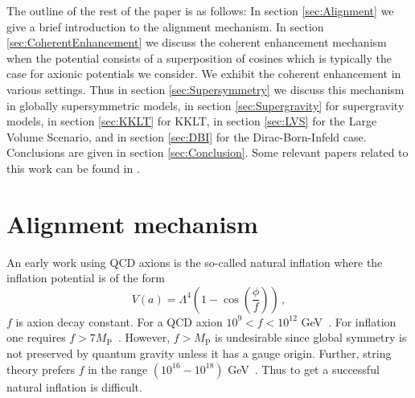 \documentclass[12pt]{article}
\begin{document}
The outline of the rest of the paper is as follows: In section \ref{sec:Alignment} we give a brief introduction to the alignment mechanism.
In section \ref{sec:CoherentEnhancement} we discuss the coherent enhancement mechanism when the potential consists of a superposition of cosines which is typically the case for axionic potentials we consider.
We exhibit the coherent enhancement in various settings.
Thus in section \ref{sec:Supersymmetry} we discuss this mechanism in globally supersymmetric models, in section \ref{sec:Supergravity} for supergravity models, in section \ref{sec:KKLT} for KKLT, in section \ref{sec:LVS} for the Large Volume Scenario, and in section \ref{sec:DBI} for the Dirac-Born-Infeld case.
Conclusions are given in section \ref{sec:Conclusion}.
Some relevant papers related to this work can be found in \cite{BlancoPillado:2006he, Conlon:2005jm, Ben-Dayan:2014lca, Gao:2014uha}.

\section{Alignment mechanism \label{sec:Alignment}}
An early work using QCD axions is the so-called natural inflation where the inflation potential is of the form
\begin{equation} \label{eq:naturalInflationPotential}
  V(a) = \Lambda^4 \left(1 - \cos\left(\frac{\phi}{f}\right)\right)\,,
\end{equation}
$f$ is axion decay constant.
For a QCD axion $10^9 < f < 10^{12}$ GeV~\cite{Svrcek:2006yi}.
For inflation one requires $f > 7 M_\text{P}$~\cite{Ade:2015lrj}.
However, $f > M_\text{P}$ is undesirable since global symmetry is not preserved by quantum gravity unless it has a gauge origin.
Further, string theory prefers $f$ in the range $\left(10^{16} - 10^{18}\right)$ GeV~\cite{Svrcek:2006yi}.
Thus to get a successful natural inflation is difficult.
\end{document}
